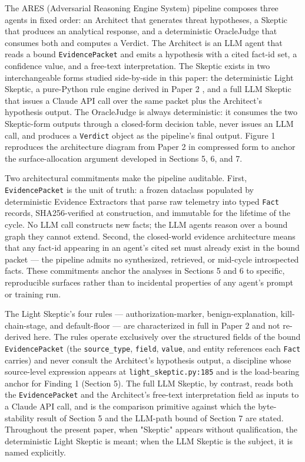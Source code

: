 \documentclass[sigconf,anonymous,review,nonacm=false]{acmart}
\begin{document}
The ARES (Adversarial Reasoning Engine System) pipeline composes three agents in fixed order: an Architect that generates threat hypotheses, a Skeptic that produces an analytical response, and a deterministic OracleJudge that consumes both and computes a Verdict. The Architect is an LLM agent that reads a bound \texttt{EvidencePacket} and emits a hypothesis with a cited fact-id set, a confidence value, and a free-text interpretation. The Skeptic exists in two interchangeable forms studied side-by-side in this paper: the deterministic Light Skeptic, a pure-Python rule engine derived in Paper 2 \citep{gmys-casiano-2026}, and a full LLM Skeptic that issues a Claude API call over the same packet plus the Architect's hypothesis output. The OracleJudge is always deterministic: it consumes the two Skeptic-form outputs through a closed-form decision table, never issues an LLM call, and produces a \texttt{Verdict} object as the pipeline's final output. Figure 1 reproduces the architecture diagram from Paper 2 in compressed form to anchor the surface-allocation argument developed in Sections 5, 6, and 7.

Two architectural commitments make the pipeline auditable. First, \texttt{EvidencePacket} is the unit of truth: a frozen dataclass populated by deterministic Evidence Extractors that parse raw telemetry into typed \texttt{Fact} records, SHA256-verified at construction, and immutable for the lifetime of the cycle. No LLM call constructs new facts; the LLM agents reason over a bound graph they cannot extend. Second, the closed-world evidence architecture means that any fact-id appearing in an agent's cited set must already exist in the bound packet — the pipeline admits no synthesized, retrieved, or mid-cycle introspected facts. These commitments anchor the analyses in Sections 5 and 6 to specific, reproducible surfaces rather than to incidental properties of any agent's prompt or training run.

The Light Skeptic's four rules — authorization-marker, benign-explanation, kill-chain-stage, and default-floor — are characterized in full in Paper 2 \citep{gmys-casiano-2026} and not re-derived here. The rules operate exclusively over the structured fields of the bound \texttt{EvidencePacket} (the \texttt{source\_type}, \texttt{field}, \texttt{value}, and entity references each \texttt{Fact} carries) and never consult the Architect's hypothesis output, a discipline whose source-level expression appears at \texttt{light\_skeptic.py:185} and is the load-bearing anchor for Finding 1 (Section 5). The full LLM Skeptic, by contrast, reads both the \texttt{EvidencePacket} and the Architect's free-text interpretation field as inputs to a Claude API call, and is the comparison primitive against which the byte-stability result of Section 5 and the LLM-path bound of Section 7 are stated. Throughout the present paper, when "Skeptic" appears without qualification, the deterministic Light Skeptic is meant; when the LLM Skeptic is the subject, it is named explicitly.
\end{document}
